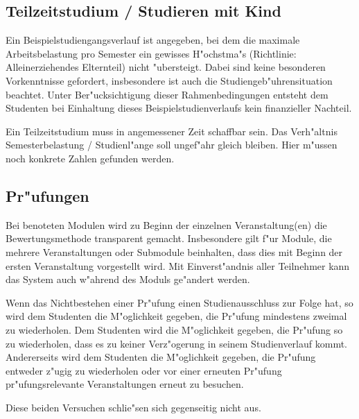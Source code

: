 \subsection{Teilzeitstudium / Studieren mit Kind}

Ein Beispielstudiengangsverlauf ist angegeben, bei dem die maximale Arbeitsbelastung 
pro Semester ein gewisses H"ochstma"s (Richtlinie: Alleinerziehendes Elternteil) nicht 
"ubersteigt. Dabei sind keine besonderen Vorkenntnisse gefordert, insbesondere ist auch
die Studiengeb"uhrensituation beachtet. Unter Ber"ucksichtigung dieser Rahmenbedingungen
entsteht dem Studenten bei Einhaltung dieses Beispielstudienverlaufs kein finanzieller
Nachteil.

\begin{kcmt}\begin{komacmt}
Ein Teilzeitstudium muss in angemessener Zeit schaffbar sein. Das Verh"altnis 
Semesterbelastung / Studienl"ange soll ungef"ahr gleich bleiben. 
Hier m"ussen noch konkrete Zahlen gefunden werden. 
\end{komacmt}\end{kcmt}

\subsection{Pr"ufungen}

Bei benoteten Modulen wird zu Beginn der einzelnen Veranstaltung(en) die Bewertungsmethode 
transparent gemacht. Insbesondere gilt f"ur Module, die mehrere Veranstaltungen 
oder Submodule beinhalten, dass dies mit Beginn der ersten Veranstaltung vorgestellt wird.
Mit Einverst"andnis aller Teilnehmer kann das System auch w"ahrend des Moduls ge"andert werden. 

Wenn das Nichtbestehen einer Pr"ufung einen Studienausschluss zur Folge hat, so 
wird dem Studenten die M"oglichkeit gegeben, die Pr"ufung mindestens zweimal
zu wiederholen. Dem Studenten wird die M"oglichkeit gegeben, die Pr"ufung 
so zu wiederholen, dass es zu keiner Verz"ogerung in seinem Studienverlauf kommt. 
Andererseits wird dem Studenten die M"oglichkeit gegeben, die Pr"ufung entweder
z"ugig zu wiederholen oder vor einer erneuten Pr"ufung pr"ufungsrelevante Veranstaltungen
erneut zu besuchen.

\begin{kcmt}\begin{komacmt}
Diese beiden Versuchen schlie"sen sich gegenseitig nicht aus.
\end{komacmt}\end{kcmt}

